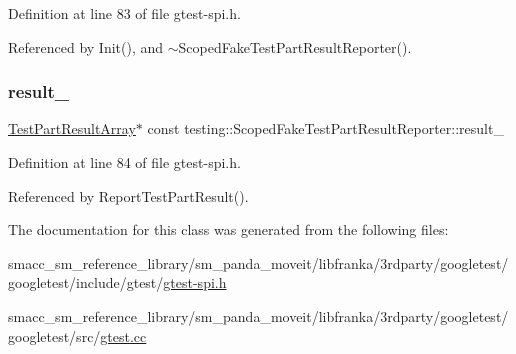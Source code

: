 Definition at line 83 of file gtest-\/spi.\+h.



Referenced by Init(), and $\sim$\+Scoped\+Fake\+Test\+Part\+Result\+Reporter().

\mbox{\label{classtesting_1_1ScopedFakeTestPartResultReporter_a729a26c94e4082ee0dc3312395a3f480}} 
\subsubsection{\texorpdfstring{result\+\_\+}{result\_}}
{\footnotesize\ttfamily \hyperlink{classtesting_1_1TestPartResultArray}{Test\+Part\+Result\+Array}$\ast$ const testing\+::\+Scoped\+Fake\+Test\+Part\+Result\+Reporter\+::result\+\_\+\hspace{0.3cm}{\ttfamily [private]}}



Definition at line 84 of file gtest-\/spi.\+h.



Referenced by Report\+Test\+Part\+Result().



The documentation for this class was generated from the following files\+:\begin{DoxyCompactItemize}
\item 
smacc\+\_\+sm\+\_\+reference\+\_\+library/sm\+\_\+panda\+\_\+moveit/libfranka/3rdparty/googletest/googletest/include/gtest/\hyperlink{gtest-spi_8h}{gtest-\/spi.\+h}\item 
smacc\+\_\+sm\+\_\+reference\+\_\+library/sm\+\_\+panda\+\_\+moveit/libfranka/3rdparty/googletest/googletest/src/\hyperlink{gtest_8cc}{gtest.\+cc}\end{DoxyCompactItemize}
